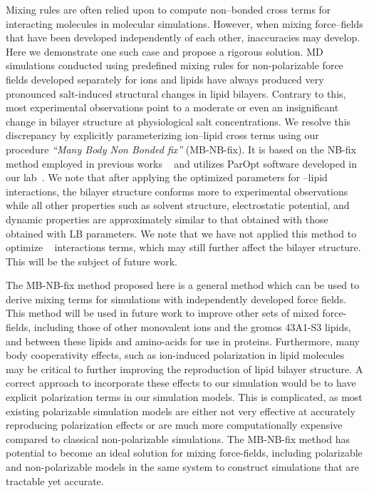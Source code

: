 Mixing rules are often relied upon to compute non--bonded cross terms 
for interacting molecules in molecular simulations. 
However, when mixing force--fields that have been developed independently of each other, 
inaccuracies may develop. 
Here we demonstrate one such case and propose a rigorous solution. 
MD simulations conducted using predefined mixing rules for 
non-polarizable force fields developed separately for ions and lipids 
have always produced very pronounced salt-induced structural changes in lipid bilayers. 
Contrary to this, most experimental observations point to a 
moderate or even an insignificant change in bilayer structure at physiological salt concentrations. 
We resolve this discrepancy by explicitly parameterizing ion--lipid cross terms
using our procedure {\em ``Many Body Non Bonded fix''} (MB-NB-fix). 
It is based on the NB-fix method employed in previous works
~\cite{baker:2010:accurate,yoo:2012:improved,fyta:2012:ionic,mamatkulov:2013:force,venable:2013,savelyev:2014:balancing,li:2015:representation,savelyev:2015:competition,jing:2017:study}
and utilizes ParOpt software developed in our lab~\cite{fogarty:2014:paropt}\cite{fogarty:2014:thesis}.
We note that after applying the optimized parameters for \na--lipid interactions, the 
bilayer structure conforms more to experimental
observations while all other properties such as solvent structure,
electrostatic potential, and dynamic properties are approximately
similar to that obtained with those obtained with LB parameters. 
We note that we have not applied this method to optimize \cl~ interactions terms, which
may still further affect the bilayer structure. This will be the subject of future work.

The MB-NB-fix method proposed here is a 
general method which can be used to derive mixing
terms for simulations with independently developed force fields. 
This method will be used in future work to improve other sets of mixed force-fields, including 
those of other monovalent ions and the gromos 43A1-S3 lipids, and between these lipids and amino-acids for use in proteins.
Furthermore, many body cooperativity effects, such as ion-induced polarization 
in lipid molecules may be critical to further improving
the reproduction of lipid bilayer structure.
A correct approach to incorporate these effects to our simulation 
would be to have explicit polarization terms in 
our simulation models. This is complicated, as most existing polarizable 
simulation models are either not very effective
at accurately reproducing polarization effects or are
much more computationally expensive compared
to classical non-polarizable simulations. The MB-NB-fix method
has potential to become an ideal solution for mixing force-fields, including
polarizable and non-polarizable models in the same system 
to construct simulations that are tractable yet accurate.
\FloatBarrier




